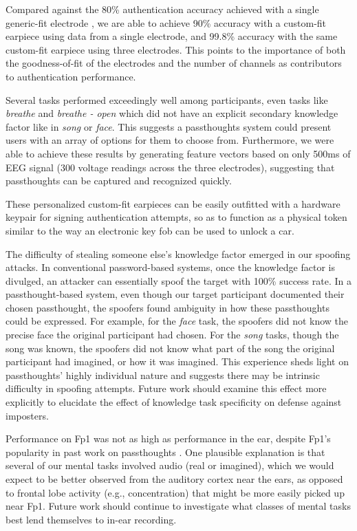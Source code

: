 \documentclass[a4paper,twoside]{article}
\begin{document}
Compared against the 80\% authentication accuracy achieved with a single generic-fit electrode \cite{curran2016passthoughts}, we are able to achieve 90\% accuracy with a custom-fit earpiece using data from a single electrode, and 99.8\% accuracy with the same custom-fit earpiece using three electrodes. This points to the importance of both the goodness-of-fit of the electrodes and the number of channels as contributors to authentication performance.

Several tasks performed exceedingly well among participants, even tasks like \textit{breathe} and \textit{breathe - open} which did not have an explicit secondary knowledge factor like in \textit{song} or \textit{face}. This suggests a passthoughts system could present users with an array of options for them to choose from. 
Furthermore, we were able to achieve these results by generating feature vectors based on only 500ms of EEG signal (300 voltage readings across the three electrodes), suggesting that passthoughts can be captured and recognized quickly.

These personalized custom-fit earpieces can be easily outfitted with a hardware keypair for signing authentication attempts, so as to function as a physical token similar to the way an electronic key fob can be used to unlock a car. 

The difficulty of stealing someone else's knowledge factor emerged in our spoofing attacks. In conventional password-based systems, once the knowledge factor is divulged, an attacker can essentially spoof the target with 100\% success rate. In a passthought-based system, even though 
our target participant documented their chosen passthought, the spoofers found ambiguity in how these passthoughts could be expressed. For example, for the \textit{face} task, the spoofers did not know the precise face the original participant had chosen. For the \textit{song} tasks, though the song was known, the spoofers did not know what part of the song the original participant had imagined, or how it was imagined. This experience sheds light on passthoughts' highly individual nature and suggests there may be intrinsic difficulty in spoofing attempts. Future work should examine this effect more explicitly to elucidate the effect of knowledge task specificity on defense against imposters.

Performance on Fp1 was not as high as performance in the ear, despite Fp1's popularity in past work on passthoughts \cite{Chuang2013b}. One plausible explanation is that several of our mental tasks involved audio (real or imagined), which we would expect to be better observed from the auditory cortex near the ears, as opposed to frontal lobe activity (e.g., concentration) that might be more easily picked up near Fp1.
Future work should continue to investigate what classes of mental tasks best lend themselves to in-ear recording.
\end{document}
